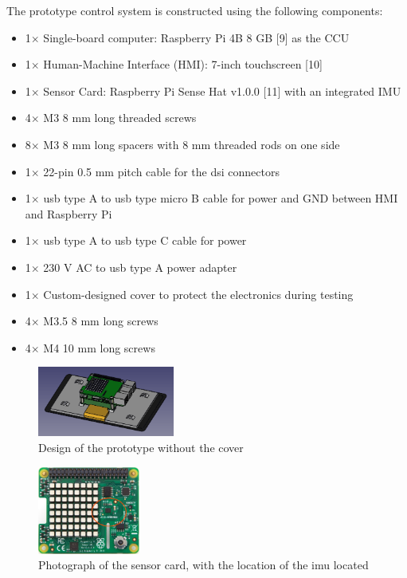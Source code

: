 \documentclass[../main.tex]{subfiles}
\begin{document}
    The prototype control system is constructed using the following components:

    \begin{itemize}
        \item 1$\times$ Single-board computer: Raspberry Pi 4B 8 GB [9] as the CCU
        \item 1$\times$ Human-Machine Interface (HMI): 7-inch touchscreen [10]
        \item 1$\times$ Sensor Card: Raspberry Pi Sense Hat v1.0.0 [11] with an integrated IMU
        \item 4$\times$ M3 8 mm long threaded screws
        \item 8$\times$ M3 8 mm long spacers with 8 mm threaded rods on one side
        \item 1$\times$ 22-pin 0.5 mm pitch cable for the \gls{dsi} connectors
        \item 1$\times$ \gls{usb} type A to \gls{usb} type micro B cable for power and GND between HMI and Raspberry Pi
        \item 1$\times$ \gls{usb} type A to \gls{usb} type C cable for power
        \item 1$\times$ 230 V AC to \gls{usb} type A power adapter
        \item 1$\times$ Custom-designed cover to protect the electronics during testing
        \item 4$\times$ M3.5 8 mm long screws
        \item 4$\times$ M4 10 mm long screws
    \end{itemize}

    \begin{figure}[htbp!]
        \centering
        \includegraphics[width=0.4\textwidth]
        {resources/images/rpi_without_cover.png}
        \caption{Design of the prototype without the cover}
        \label{fig:prototype_graphics_without_cover}
    \end{figure}

    \begin{figure}[htbp]
        \centering
        \includegraphics[width=0.3\textwidth]
        {resources/images/raspberry-pi-sense-hat-imu-in-circle.png}
        \caption{Photograph of the sensor card, with the location of the \gls{imu} located}
        \label{fig:raspberry-pi-sense-hat-imu-in-circle}
    \end{figure}
\end{document}

